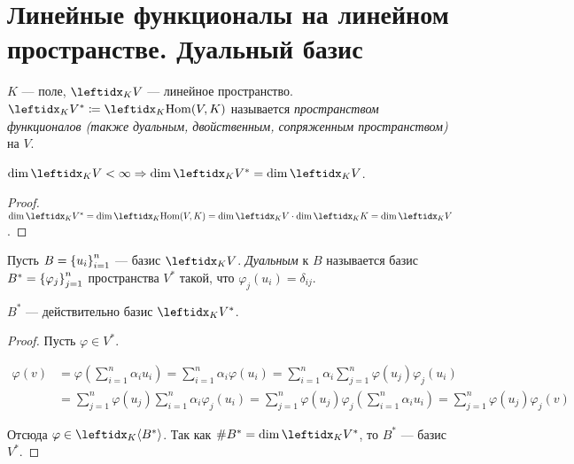 \section{Линейные функционалы на линейном пространстве. Дуальный базис}

\begin{defn}
    $K$ --- поле, $\lsub{K}{V}$ --- линейное пространство. $\lsub{K}{V^*} \coloneqq \lsub{K}{\hom(V, K)}$ называется \textit{пространством функционалов (также дуальным, двойственным, сопряженным пространством)} на $V$.
\end{defn}

\begin{thm}
    $\dim \lsub{K}{V} < \infty \Rightarrow \dim \lsub{K}{V^*} = \dim \lsub{K}{V}$.
\end{thm}

\begin{proof}
    $\dim \lsub{K}{V^*} = \dim \lsub{K}{\hom(V, K)} = \dim \lsub{K}{V} \cdot \dim \lsub{K}{K} = \dim \lsub{K}{V}$.
\end{proof}

\begin{defn}
    Пусть $B = \left\{u_i\right\}_{i=1}^{n}$ --- базис $\lsub{K}{V}$. \textit{Дуальным} к $B$ называется базис $B^* = \left\{\varphi_j\right\}_{j=1}^{n}$ пространства $V^*$ такой, что $\varphi_j(u_i) = \delta_{ij}$.
\end{defn}

\begin{thm}
    $B^*$ --- действительно базис $\lsub{K}{V^*}$.
\end{thm}

\begin{proof}
    Пусть $\varphi \in V^*$.
    
    \begin{align*}
        \varphi(v) &= \varphi\left(\sum_{i=1}^n \alpha_i u_i\right) = \sum_{i=1}^n \alpha_i \varphi(u_i) = \sum_{i=1}^n \alpha_i \sum_{j=1}^n \varphi(u_j) \varphi_j(u_i) \\
        &= \sum_{j=1}^n \varphi(u_j) \sum_{i=1}^n \alpha_i \varphi_j(u_i) = \sum_{j=1}^n \varphi(u_j) \varphi_j \left(\sum_{i=1}^n \alpha_i u_i \right) = \sum_{j=1}^n \varphi(u_j) \varphi_j(v)
    \end{align*}
    
    Отсюда $\varphi \in \gen{K}{B^*}$. Так как $\#B^* = \dim \lsub{K}{V^*}$, то $B^*$ --- базис $V^*$.
\end{proof}